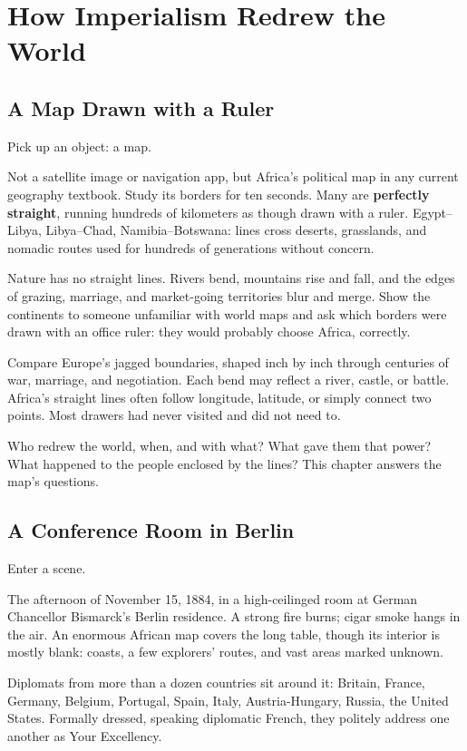 \chapter{How Imperialism Redrew the World}
\section{A Map Drawn with a Ruler}
Pick up an object: a map.

Not a satellite image or navigation app, but Africa's political map in any current geography textbook. Study its borders for ten seconds. Many are \textbf{perfectly straight}, running hundreds of kilometers as though drawn with a ruler. Egypt--Libya, Libya--Chad, Namibia--Botswana: lines cross deserts, grasslands, and nomadic routes used for hundreds of generations without concern.

Nature has no straight lines. Rivers bend, mountains rise and fall, and the edges of grazing, marriage, and market-going territories blur and merge. Show the continents to someone unfamiliar with world maps and ask which borders were drawn with an office ruler: they would probably choose Africa, correctly.

Compare Europe's jagged boundaries, shaped inch by inch through centuries of war, marriage, and negotiation. Each bend may reflect a river, castle, or battle. Africa's straight lines often follow longitude, latitude, or simply connect two points. Most drawers had never visited and did not need to.

Who redrew the world, when, and with what? What gave them that power? What happened to the people enclosed by the lines? This chapter answers the map's questions.

\section{A Conference Room in Berlin}
Enter a scene.

The afternoon of November 15, 1884, in a high-ceilinged room at German Chancellor Bismarck's Berlin residence. A strong fire burns; cigar smoke hangs in the air. An enormous African map covers the long table, though its interior is mostly blank: coasts, a few explorers' routes, and vast areas marked unknown.

Diplomats from more than a dozen countries sit around it: Britain, France, Germany, Belgium, Portugal, Spain, Italy, Austria-Hungary, Russia, the United States. Formally dressed, speaking diplomatic French, they politely address one another as Your Excellency.

